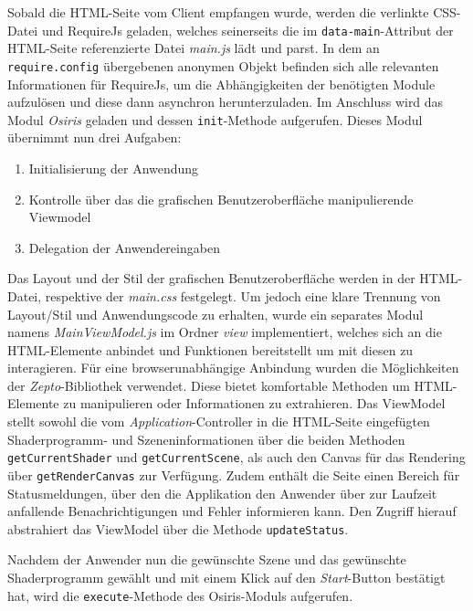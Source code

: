 Sobald die HTML-Seite vom Client empfangen wurde, werden die verlinkte CSS-Datei und RequireJs geladen, welches seinerseits die im \texttt{data-main}-Attribut der HTML-Seite referenzierte Datei \textit{main.js} lädt und parst. In dem an \texttt{require.\-config} übergebenen anonymen Objekt befinden sich alle relevanten Informationen für RequireJs, um die Abhängigkeiten der benötigten Module aufzulösen und diese dann asynchron herunterzuladen. Im Anschluss wird das Modul \textit{Osiris} geladen und dessen \texttt{init}-Methode aufgerufen. Dieses Modul übernimmt nun drei Aufgaben:
\begin{enumerate}
    \item Initialisierung der Anwendung
    \item Kontrolle über das die grafischen Benutzeroberfläche manipulierende Viewmodel 
    \item Delegation der Anwendereingaben
\end{enumerate}
Das Layout und der Stil der grafischen Benutzeroberfläche werden in der HTML-Datei, respektive der \textit{main.css} festgelegt. Um jedoch eine klare Trennung von Layout/Stil und Anwendungscode zu erhalten, wurde ein separates Modul namens \textit{MainViewModel.js} im Ordner \textit{view} implementiert, welches sich an die HTML-Elemente anbindet und Funktionen bereitstellt um mit diesen zu interagieren. Für eine browserunabhängige Anbindung wurden die Möglichkeiten der \textit{Zepto}-Bibliothek verwendet. Diese bietet komfortable Methoden um HTML-Elemente zu manipulieren oder Informationen zu extrahieren. Das ViewModel stellt sowohl die vom \textit{Application}-Controller in die HTML-Seite eingefügten Shaderprogramm- und Szeneninformationen über die beiden Methoden \texttt{getCurrentShader} und \texttt{getCurrentScene}, als auch den Canvas für das Rendering über \texttt{getRenderCanvas} zur Verfügung. Zudem enthält die Seite einen Bereich für Statusmeldungen, über den die Applikation den Anwender über zur Laufzeit anfallende Benachrichtigungen und Fehler informieren kann. Den Zugriff hierauf abstrahiert das ViewModel über die Methode \texttt{updateStatus}.

Nachdem der Anwender nun die gewünschte Szene und das gewünschte Shaderprogramm gewählt und mit einem Klick auf den \textit{Start}-Button bestätigt hat, wird die \texttt{execute}-Methode des Osiris-Moduls aufgerufen.

